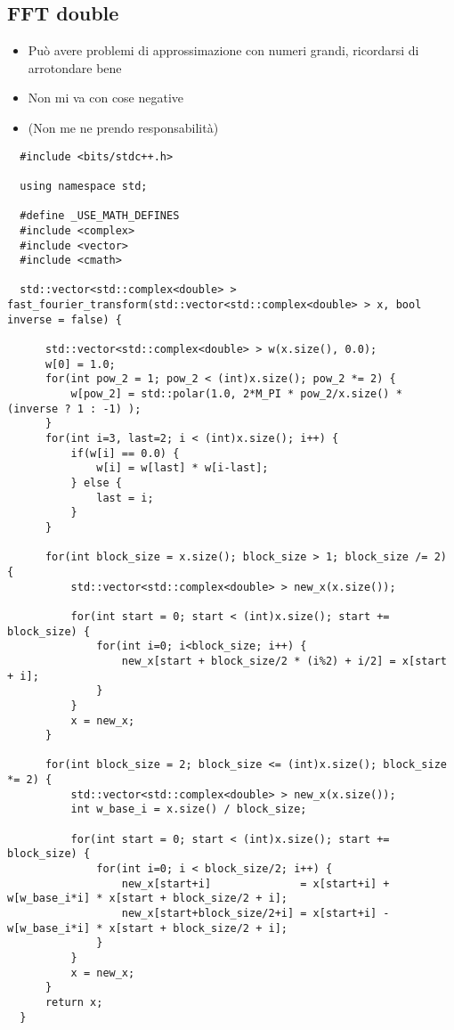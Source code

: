 \documentclass{article}
\begin{document}
\subsection{FFT double}
\begin{itemize}
    \item Può avere problemi di approssimazione con numeri grandi, ricordarsi di arrotondare bene
    \item Non mi va con cose negative
    \item (Non me ne prendo responsabilità)
\end{itemize}
\begin{lstlisting}
  #include <bits/stdc++.h>

  using namespace std;

  #define _USE_MATH_DEFINES
  #include <complex>
  #include <vector>
  #include <cmath>

  std::vector<std::complex<double> > fast_fourier_transform(std::vector<std::complex<double> > x, bool inverse = false) {

      std::vector<std::complex<double> > w(x.size(), 0.0);
      w[0] = 1.0;
      for(int pow_2 = 1; pow_2 < (int)x.size(); pow_2 *= 2) {
          w[pow_2] = std::polar(1.0, 2*M_PI * pow_2/x.size() * (inverse ? 1 : -1) );
      }
      for(int i=3, last=2; i < (int)x.size(); i++) {
          if(w[i] == 0.0) {
              w[i] = w[last] * w[i-last];
          } else {
              last = i;
          }
      }

      for(int block_size = x.size(); block_size > 1; block_size /= 2) {
          std::vector<std::complex<double> > new_x(x.size());

          for(int start = 0; start < (int)x.size(); start += block_size) {
              for(int i=0; i<block_size; i++) {
                  new_x[start + block_size/2 * (i%2) + i/2] = x[start + i];
              }
          }
          x = new_x;
      }

      for(int block_size = 2; block_size <= (int)x.size(); block_size *= 2) {
          std::vector<std::complex<double> > new_x(x.size());
          int w_base_i = x.size() / block_size;

          for(int start = 0; start < (int)x.size(); start += block_size) {
              for(int i=0; i < block_size/2; i++) {
                  new_x[start+i]              = x[start+i] + w[w_base_i*i] * x[start + block_size/2 + i];
                  new_x[start+block_size/2+i] = x[start+i] - w[w_base_i*i] * x[start + block_size/2 + i];
              }
          }
          x = new_x;
      }
      return x;
  }
  

\end{lstlisting}
\end{document}
